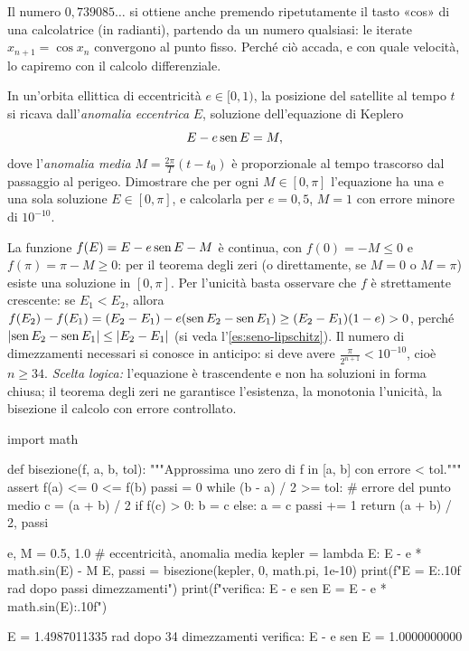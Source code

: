 Il numero $0{,}739085\ldots$ si ottiene anche premendo ripetutamente il tasto «cos» di
una calcolatrice (in radianti), partendo da un numero qualsiasi: le iterate
$x_{n+1}=\cos x_{n}$ convergono al punto fisso. Perché ciò accada, e con quale velocità, lo
capiremo con il calcolo differenziale.

\begin{esercizio}\label{es:kepler}
In un'orbita ellittica di eccentricità $e\in[0,1)$, la posizione del satellite al tempo
$t$ si ricava dall'\emph{anomalia eccentrica} $E$, soluzione dell'equazione di Keplero
\[
  E-e\operatorname{sen} E=M,
\]
dove l'\emph{anomalia media} $M=\frac{2\pi}{T}(t-t_{0})$ è proporzionale al tempo trascorso
dal passaggio al perigeo. Dimostrare che per ogni $M\in[0,\pi]$ l'equazione ha una e una
sola soluzione $E\in[0,\pi]$, e calcolarla per $e=0{,}5$, $M=1$ con errore minore di
$10^{-10}$.
\begin{soluzione}
La funzione $f(E)=E-e\operatorname{sen} E-M$ è continua, con $f(0)=-M\le0$ e
$f(\pi)=\pi-M\ge0$: per il teorema degli zeri (o direttamente, se $M=0$ o $M=\pi$) esiste
una soluzione in $[0,\pi]$. Per l'unicità basta osservare che $f$ è strettamente
crescente: se $E_{1}<E_{2}$, allora
$f(E_{2})-f(E_{1})=(E_{2}-E_{1})-e(\operatorname{sen} E_{2}-\operatorname{sen} E_{1})\ge(E_{2}-E_{1})(1-e)>0$, perché
$\lvert \operatorname{sen} E_{2}-\operatorname{sen} E_{1}\rvert\le\lvert E_{2}-E_{1}\rvert$ (si veda l'\cref{es:seno-lipschitz}).
Il numero di dimezzamenti necessari si conosce in anticipo: si deve avere
$\frac{\pi}{2^{n+1}}<10^{-10}$, cioè $n\ge34$. \emph{Scelta logica:} l'equazione è
trascendente e non ha soluzioni in forma chiusa; il teorema degli zeri ne garantisce
l'esistenza, la monotonia l'unicità, la bisezione il calcolo con errore controllato.
\end{soluzione}
\end{esercizio}

\begin{python}
import math

def bisezione(f, a, b, tol):
    """Approssima uno zero di f in [a, b] con errore < tol."""
    assert f(a) <= 0 <= f(b)
    passi = 0
    while (b - a) / 2 >= tol:      # errore del punto medio
        c = (a + b) / 2
        if f(c) > 0:
            b = c
        else:
            a = c
        passi += 1
    return (a + b) / 2, passi

e, M = 0.5, 1.0                    # eccentricità, anomalia media
kepler = lambda E: E - e * math.sin(E) - M
E, passi = bisezione(kepler, 0, math.pi, 1e-10)
print(f"E = {E:.10f} rad  dopo {passi} dimezzamenti")
print(f"verifica: E - e sen E = {E - e * math.sin(E):.10f}")
\end{python}
\begin{risultato}
E = 1.4987011335 rad  dopo 34 dimezzamenti
verifica: E - e sen E = 1.0000000000
\end{risultato}

